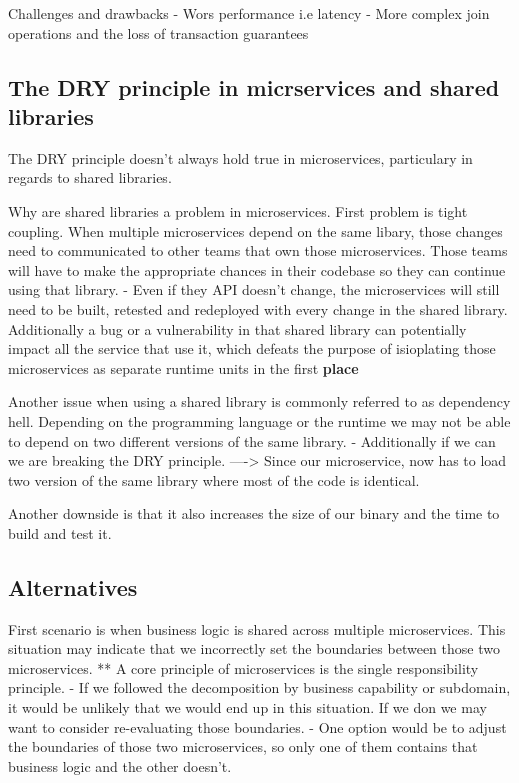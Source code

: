 \documentclass[a4paper, 11pt]{book}
\begin{document}
    Challenges and drawbacks
    - Wors performance i.e latency
    - More complex join operations and the loss of transaction guarantees

    \subsection{The DRY principle in micrservices and shared libraries}
    The DRY principle doesn't always hold true in microservices, particulary in regards to shared libraries.

    Why are shared libraries a problem in microservices.
    First problem is tight coupling.
    When multiple microservices depend on the same libary, those changes need to communicated to other teams that own those microservices.
    Those teams will have to make the appropriate chances in their codebase so they can continue using that library.
    - Even if they API doesn't change, the microservices will still need to be built, retested and redeployed with every change in the shared library.
    Additionally a bug or a vulnerability in that shared library can potentially impact all the service that use it, which defeats the purpose of isioplating those microservices as separate runtime units in the first \textbf{place}

    Another issue when using a shared library is commonly referred to as dependency hell.
    Depending on the programming language or the runtime we may not be able to depend on two different versions of the same library.
    - Additionally if we can we are breaking the DRY principle.
    ----> Since our microservice, now has to load two version of the same library where most of the code is identical.

    Another downside is that it also increases the size of our binary and the time to build and test it.

    \subsection{Alternatives}
    First scenario is when business logic is shared across multiple microservices.
    This situation may indicate that we incorrectly set the boundaries between those two microservices.
    ** A core principle of microservices is the single responsibility principle.
    - If we followed the decomposition by business capability or subdomain, it would be unlikely that we would end up in this situation.
    If we don we may want to consider re-evaluating those boundaries.
    - One option would be to adjust the boundaries of those two microservices, so only one of them contains that business logic and the other doesn't.
\end{document}
